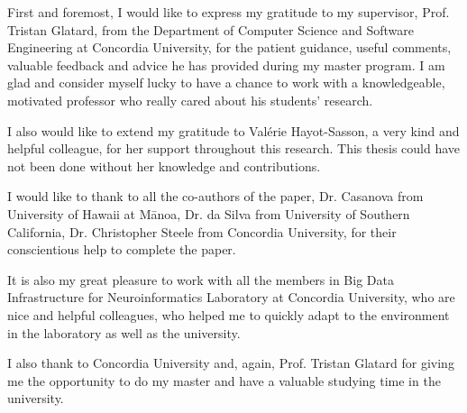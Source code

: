 \begin{acknowledgments}

First and foremost, I would like to express my gratitude to my supervisor, 
Prof. Tristan Glatard, from the Department of Computer Science and 
Software Engineering at Concordia University, for the patient guidance, 
useful comments, valuable feedback and advice he has provided 
during my master program. 
I am glad and consider myself lucky to have a chance to work 
with a knowledgeable, motivated professor who really cared about 
his students' research. 

I also would like to extend my gratitude to Val\'erie Hayot-Sasson, 
a very kind and helpful colleague, for her support throughout this research. 
This thesis could have not been done without her knowledge and contributions. 

I would like to thank to all the co-authors of the paper, Dr. Casanova from 
University of Hawaii at Mānoa, Dr. da Silva from University of Southern California, 
Dr. Christopher Steele from Concordia University, for their conscientious help 
to complete the paper. 

It is also my great pleasure to work with all the members in Big Data 
Infrastructure for Neuroinformatics Laboratory at Concordia University, 
who are nice and helpful colleagues, who helped me to quickly adapt to 
the environment in the laboratory as well as the university. 

I also thank to Concordia University and, again, Prof. Tristan Glatard for 
giving me the opportunity to do my master and have a valuable 
studying time in the university.

\end{acknowledgments}